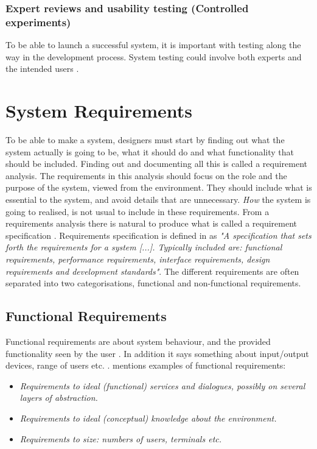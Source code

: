 \subsubsection{Expert reviews and usability testing (Controlled experiments)}
To be able to launch a successful system, it is important with testing along the way in the development process. System testing could involve both experts and the intended users \cite{mmi}. 

\section{System Requirements}
\label{sec:systemreq}
To be able to make a system, designers must start by finding out what the system actually is going to be, what it should do and what functionality that should be included. Finding out and documenting all this is called a requirement analysis. The requirements in this analysis should focus on the role and the purpose of the system, viewed from the environment. They should include what is essential to the system, and avoid details that are unnecessary. \emph{How} the system is going to realised, is not usual to include in these requirements. From a requirements analysis there is natural to produce what is called a requirement specification \cite{braude2000software}. Requirements specification is defined in \cite{systemutviklingDel1} as \emph{"A specification that sets forth the requirements for a system [...]. Typically included are: functional requirements, performance requirements, interface requirements, design requirements and development standards"}. The different requirements are often separated into two categorisations, functional and non-functional requirements. 

\subsection{Functional Requirements}
Functional requirements are about system behaviour, and the provided functionality seen by the user \cite{systemutviklingDel1}. In addition it says something about input/output devices, range of users etc. \cite{mmi}. \cite{systemutviklingDel1} mentions examples of functional requirements:
\begin{itemize}
\item \emph{Requirements to ideal (functional) services and dialogues, possibly on several layers of abstraction.}
\item \emph{Requirements to ideal (conceptual) knowledge about the environment.}
\item \emph{Requirements to size: numbers of users, terminals etc.}
\end{itemize}     


